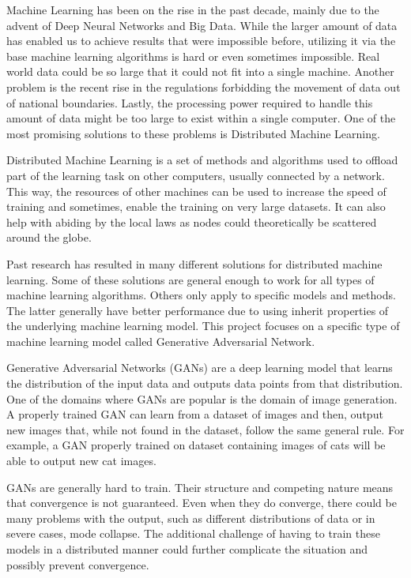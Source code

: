 \documentclass[11pt]{article}       %
\begin{document}
Machine Learning has been on the rise in the past decade, mainly due to the advent of Deep Neural Networks and Big Data. While the larger amount of data has enabled us to achieve results that were impossible before, utilizing it via the base machine learning algorithms is hard or even sometimes impossible. Real world data could be so large that it could not fit into a single machine. Another problem is the recent rise in the regulations forbidding the movement of data out of national boundaries. Lastly, the processing power required to handle this amount of data might be too large to exist within a single computer. One of the most promising solutions to these problems is Distributed Machine Learning.

Distributed Machine Learning is a set of methods and algorithms used to offload part of the learning task on other computers, usually connected by a network. This way, the resources of other machines can be used to increase the speed of training and sometimes, enable the training on very large datasets. It can also help with abiding by the local laws as nodes could theoretically be scattered around the globe. 

Past research has resulted in many different solutions for distributed machine learning. Some of these solutions are general enough to work for all types of machine learning algorithms. Others only apply to specific models and methods. The latter generally have better performance due to using inherit properties of the underlying machine learning model. This project focuses on a specific type of machine learning model called Generative Adversarial Network.

Generative Adversarial Networks (GANs)\cite{goodfellow2014generative} are a deep learning model that learns the distribution of the input data and outputs data points from that distribution. One of the domains where GANs are popular is the domain of image generation. A properly trained GAN can learn from a dataset of images and then, output new images that, while not found in the dataset, follow the same general rule. For example, a GAN properly trained on dataset containing images of cats will be able to output new cat images.

GANs are generally hard to train.\cite{mescheder2018training} Their structure and competing nature means that convergence is not guaranteed. Even when they do converge, there could be many problems with the output, such as different distributions of data or in severe cases, mode collapse. The additional challenge of having to train these models in a distributed manner could further complicate the situation and possibly prevent convergence. 
\end{document}

